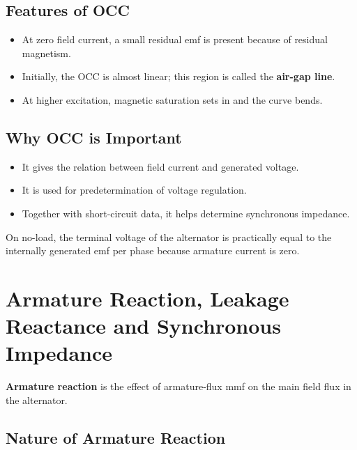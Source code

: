 \documentclass[12pt,a4paper]{article}
\begin{document}
\subsection{Features of OCC}

\begin{itemize}[leftmargin=*]
  \item At zero field current, a small residual emf is present because of residual magnetism.
  \item Initially, the OCC is almost linear; this region is called the \textbf{air-gap line}.
  \item At higher excitation, magnetic saturation sets in and the curve bends.
\end{itemize}

\subsection{Why OCC is Important}

\begin{itemize}[leftmargin=*]
  \item It gives the relation between field current and generated voltage.
  \item It is used for predetermination of voltage regulation.
  \item Together with short-circuit data, it helps determine synchronous impedance.
\end{itemize}

\begin{notebox}
On no-load, the terminal voltage of the alternator is practically equal to the internally generated emf per phase because armature current is zero.
\end{notebox}

\section{Armature Reaction, Leakage Reactance and Synchronous Impedance}

\begin{definebox}
\textbf{Armature reaction} is the effect of armature-flux mmf on the main field flux in the alternator.
\end{definebox}

\subsection{Nature of Armature Reaction}
\end{document}
